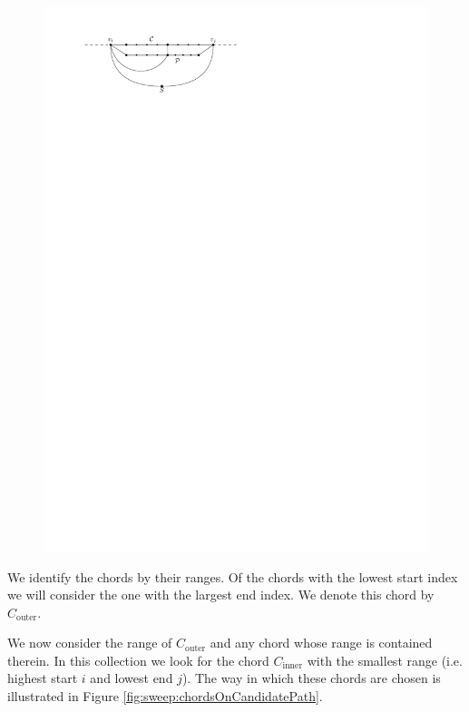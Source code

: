       \begin{figure}[h]
        \centering
        \includegraphics[scale=1]{unifiedAlgo/img/sweep/noChordOnExtriorVertex.pdf}
        \caption{}
        \label{fig:sweep:noChordOnExteriorVertex}
      \end{figure}


    We identify the chords by their ranges. Of the chords with the lowest start index we will consider the one with the largest end index. We denote this chord by $C_\text{outer}$.

    We now consider the range of $C_\text{outer}$ and any chord whose range is contained therein. In this collection we look for the chord $C_\text{inner}$ with the smallest range (i.e. highest start $i$ and lowest end $j$).
    The way in which these chords are chosen is illustrated in Figure \ref{fig:sweep:chordsOnCandidatePath}.

